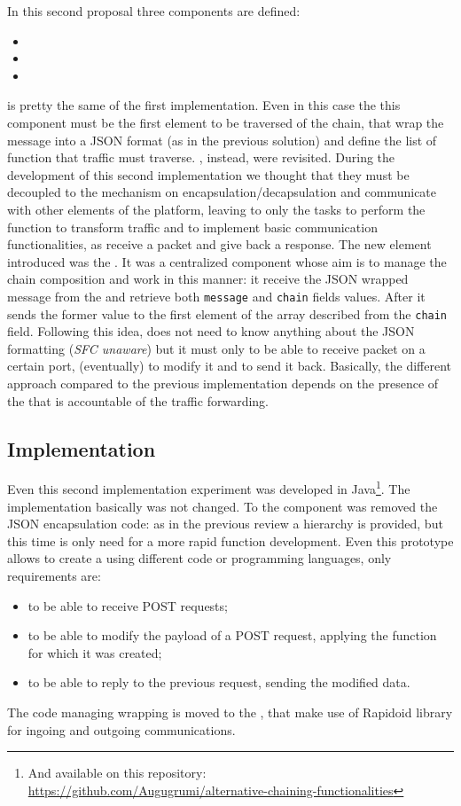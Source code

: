 In this second proposal three components are defined:
\begin{itemize}
  \item \enchainer{}
  \item \dispatcher{}
  \item \vnfs{}
\end{itemize}
\enchainer{} is pretty the same of the first implementation. Even in this case
the this component must be the first element to be traversed of the chain, that
wrap the message into a JSON format (as in the previous solution) and define the
list of function that traffic must traverse. \vnfs{}, instead, were revisited.
During the development of this second implementation we thought that they must
be decoupled to the mechanism on encapsulation/decapsulation and communicate
with other elements of the platform, leaving to \vnf{} only the tasks
to perform the function to transform traffic and to implement basic
communication functionalities, as receive a packet and give back a response. The
new element introduced was the \dispatcher{}. It was a centralized component
whose aim is to manage the chain composition and work in this manner: it receive
the JSON wrapped message from the \enchainer{} and retrieve both
\texttt{message} and \texttt{chain} fields values. After it sends the former
value to the first element of the array described from the \texttt{chain} field.
Following this idea, \vnfs{} does not need to know anything about the JSON
formatting (\emph{SFC unaware}) but it must only to be able to receive packet on
a certain port, (eventually) to modify it and to send it back. Basically, the
different approach compared to the previous implementation depends on the
presence of the \dispatcher{} that is accountable of the traffic forwarding.

\subsection{Implementation}
Even this second implementation experiment was developed in Java\footnote{And
available on this repository: \\
\url{https://github.com/Augugrumi/alternative-chaining-functionalities}}. The
\enchainer{} implementation basically was not changed. To the \vnf{} component
was removed the JSON encapsulation code: as in the previous review a hierarchy
is provided, but this time is only need for a more rapid function development.
Even this prototype allows to create a \vnf{} using different code or
programming languages, only requirements are:
\begin{itemize}
  \item to be able to receive POST requests;
  \item to be able to modify the payload of a POST request, applying the
  function for which it was created;
  \item to be able to reply to the previous request, sending the modified data.
\end{itemize}
The code managing wrapping is moved to the \dispatcher{}, that make use of
Rapidoid library for ingoing and outgoing communications.

